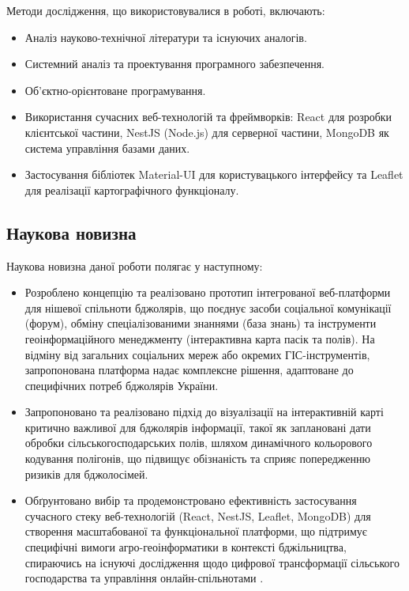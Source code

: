 Методи дослідження, що використовувалися в роботі, включають:
\begin{itemize}
    \item Аналіз науково-технічної літератури та існуючих аналогів.
    \item Системний аналіз та проектування програмного забезпечення.
    \item Об'єктно-орієнтоване програмування.
    \item Використання сучасних веб-технологій та фреймворків: React для розробки клієнтської частини, NestJS (Node.js) для серверної частини, MongoDB як система управління базами даних.
    \item Застосування бібліотек Material-UI для користувацького інтерфейсу та Leaflet для реалізації картографічного функціоналу.
\end{itemize}

\subsection*{Наукова новизна}
Наукова новизна даної роботи полягає у наступному:
\begin{itemize}
    \item Розроблено концепцію та реалізовано прототип інтегрованої веб-платформи для нішевої спільноти бджолярів, що поєднує засоби соціальної комунікації (форум), обміну спеціалізованими знаннями (база знань) та інструменти геоінформаційного менеджменту (інтерактивна карта пасік та полів). На відміну від загальних соціальних мереж або окремих ГІС-інструментів, запропонована платформа надає комплексне рішення, адаптоване до специфічних потреб бджолярів України.
    \item Запропоновано та реалізовано підхід до візуалізації на інтерактивній карті критично важливої для бджолярів інформації, такої як заплановані дати обробки сільськогосподарських полів, шляхом динамічного кольорового кодування полігонів, що підвищує обізнаність та сприяє попередженню ризиків для бджолосімей.
    \item Обґрунтовано вибір та продемонстровано ефективність застосування сучасного стеку веб-технологій (React, NestJS, Leaflet, MongoDB) для створення масштабованої та функціональної платформи, що підтримує специфічні вимоги агро-геоінформатики в контексті бджільництва, спираючись на існуючі дослідження щодо цифрової трансформації сільського господарства та управління онлайн-спільнотами \cite{preece2005onlinecommunities, huet2022digitalbeekeeping, guruprasad2024beeopen}.
\end{itemize}

